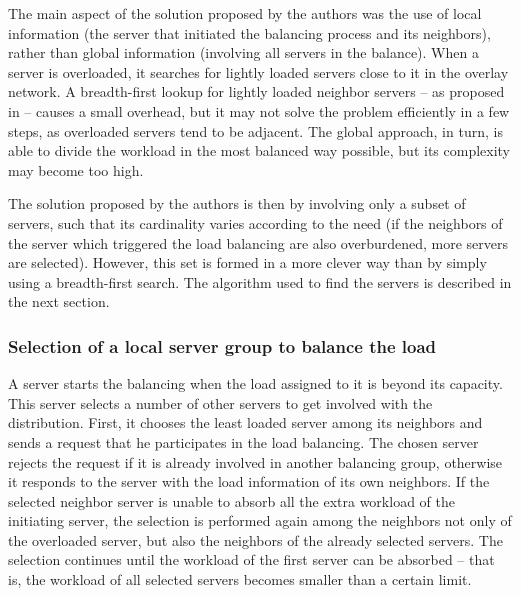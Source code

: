 The main aspect of the solution proposed by the authors was the use of local information (the server that initiated the balancing process and its neighbors), rather than global information (involving all servers in the balance). When a server is overloaded, it searches for lightly loaded servers close to it in the overlay network. A breadth-first lookup for lightly loaded neighbor servers -- as proposed in \cite{duong2003dls} -- causes a small overhead, but it may not solve the problem efficiently in a few steps, as overloaded servers tend to be adjacent. The global approach, in turn, is able to divide the workload in the most balanced way possible, but its complexity may become too high.

The solution proposed by the authors is then by involving only a subset of servers, such that its cardinality varies according to the need (if the neighbors of the server which triggered the load balancing are also overburdened, more servers are selected). However, this set is formed in a more clever way than by simply using a breadth-first search. The algorithm used to find the servers is described in the next section.

\subsubsection{Selection of a local server group to balance the load}
\label{sec:regselect}
	
A server starts the balancing when the load assigned to it is beyond its capacity. This server selects a number of other servers to get involved with the distribution. First, it chooses the least loaded server among its neighbors and sends a request that he participates in the load balancing. The chosen server rejects the request if it is already involved in another balancing group, otherwise it responds to the server with the load information of its own neighbors. If the selected neighbor server is unable to absorb all the extra workload of the initiating server, the selection is performed again among the neighbors not only of the overloaded server, but also the neighbors of the already selected servers. The selection continues until the workload of the first server can be absorbed -- that is, the workload of all selected servers becomes smaller than a certain limit.

